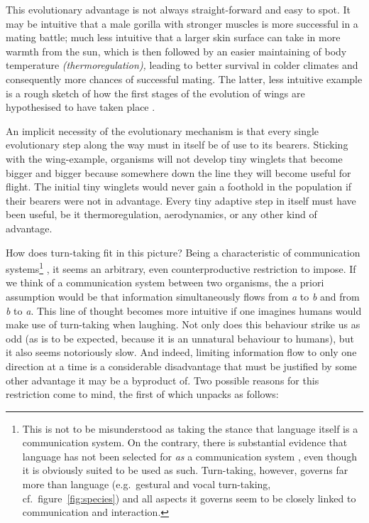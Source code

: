 This evolutionary advantage is not always straight-forward and easy to spot.
It may be intuitive that a male gorilla with stronger muscles is more successful in a mating battle; much less intuitive that a larger skin surface can take in more warmth from the sun, which is then followed by an easier maintaining of body temperature \emph{(thermoregulation),} leading to better survival in colder climates and consequently more chances of successful mating.
The latter, less intuitive example is a rough sketch of how the first stages of the evolution of wings are hypothesised to have taken place \citep{douglas_thermoregulatory_1981,kingsolver_aerodynamics_1985}.

An implicit necessity of the evolutionary mechanism is that every single evolutionary step along the way must in itself be of use to its bearers.
Sticking with the wing-example, organisms will not develop tiny winglets that become bigger and bigger because somewhere down the line they will become useful for flight.
The initial tiny winglets would never gain a foothold in the population if their bearers were not in advantage.
Every tiny adaptive step in itself must have been useful, be it thermoregulation, aerodynamics, or any other kind of advantage.

How does turn-taking fit in this picture?
Being a characteristic of communication systems\footnote{%
This is not to be misunderstood as taking the stance that language itself is a communication system.
On the contrary, there is substantial evidence that language has not been selected for \emph{as} a communication system \citep{reboul_why_2015}, even though it is obviously suited to be used as such. Turn-taking, however, governs far more than language (e.g.~gestural and vocal turn-taking, cf.~figure~\ref{fig:species}) and all aspects it governs seem to be closely linked to communication and interaction.}%
, it seems an arbitrary, even counterproductive restriction to impose.
If we think of a communication system between two organisms, the a priori assumption would be that information simultaneously flows from \emph{a} to \emph{b} and from \emph{b} to \emph{a}.
This line of thought becomes more intuitive if one imagines humans would make use of turn-taking when laughing.
Not only does this behaviour strike us as odd (as is to be expected, because it is an unnatural behaviour to humans), but it also seems notoriously slow.
And indeed, limiting information flow to only one direction at a time is a considerable disadvantage that must be justified by some other advantage it may be a byproduct of.
Two possible reasons for this restriction come to mind, the first of which unpacks as follows:

